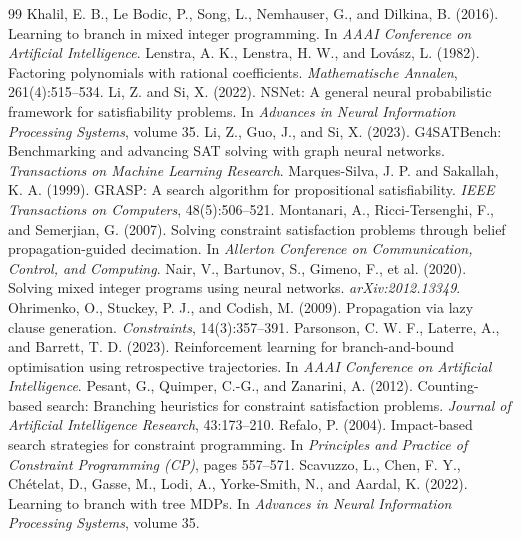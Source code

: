\documentclass[final,5p,times,twocolumn]{elsarticle}
\begin{document}
\begin{thebibliography}{99}
 Khalil, E. B., Le Bodic, P., Song, L., Nemhauser, G., and Dilkina, B. (2016). Learning to branch in mixed integer programming. In \emph{AAAI Conference on Artificial Intelligence}.
 Lenstra, A. K., Lenstra, H. W., and Lov\'asz, L. (1982). Factoring polynomials with rational coefficients. \emph{Mathematische Annalen}, 261(4):515--534.
 Li, Z. and Si, X. (2022). NSNet: A general neural probabilistic framework for satisfiability problems. In \emph{Advances in Neural Information Processing Systems}, volume 35.
 Li, Z., Guo, J., and Si, X. (2023). G4SATBench: Benchmarking and advancing SAT solving with graph neural networks. \emph{Transactions on Machine Learning Research}.
 Marques-Silva, J. P. and Sakallah, K. A. (1999). GRASP: A search algorithm for propositional satisfiability. \emph{IEEE Transactions on Computers}, 48(5):506--521.
 Montanari, A., Ricci-Tersenghi, F., and Semerjian, G. (2007). Solving constraint satisfaction problems through belief propagation-guided decimation. In \emph{Allerton Conference on Communication, Control, and Computing}.
 Nair, V., Bartunov, S., Gimeno, F., et al. (2020). Solving mixed integer programs using neural networks. \emph{arXiv:2012.13349}.
 Ohrimenko, O., Stuckey, P. J., and Codish, M. (2009). Propagation via lazy clause generation. \emph{Constraints}, 14(3):357--391.
 Parsonson, C. W. F., Laterre, A., and Barrett, T. D. (2023). Reinforcement learning for branch-and-bound optimisation using retrospective trajectories. In \emph{AAAI Conference on Artificial Intelligence}.
 Pesant, G., Quimper, C.-G., and Zanarini, A. (2012). Counting-based search: Branching heuristics for constraint satisfaction problems. \emph{Journal of Artificial Intelligence Research}, 43:173--210.
 Refalo, P. (2004). Impact-based search strategies for constraint programming. In \emph{Principles and Practice of Constraint Programming (CP)}, pages 557--571.
 Scavuzzo, L., Chen, F. Y., Ch\'etelat, D., Gasse, M., Lodi, A., Yorke-Smith, N., and Aardal, K. (2022). Learning to branch with tree MDPs. In \emph{Advances in Neural Information Processing Systems}, volume 35.

\end{thebibliography}
\end{document}
